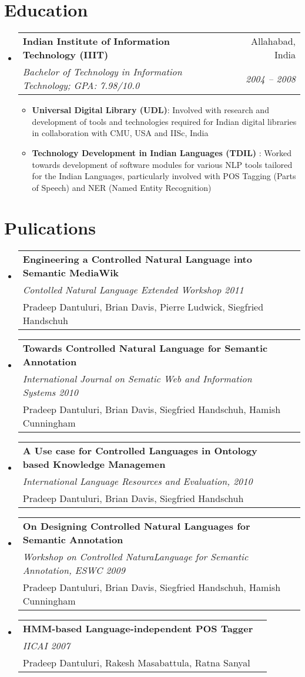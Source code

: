\documentclass[letterpaper,11pt]{article}
\makeatletter
\newcommand{\resumeItem}[2]{
  \item\small{
    \textbf{#1}{: #2 \vspace{-2pt}}
  }
}
\newcommand{\resumeSubheading}[4]{
  \vspace{-1pt}\item
    \begin{tabular*}{0.97\textwidth}[t]{l@{\extracolsep{\fill}}r}
      \textbf{#1} & #2 \\
      \textit{\small#3} & \textit{\small #4} \\
    \end{tabular*}\vspace{-5pt}
}
\newcommand{\pubItem}[3]{
  \vspace{-1pt}\item
    \begin{tabular*}{0.97\textwidth}[t]{l@{\extracolsep{\fill}}r}
      \textbf{#1} &   \\
      \textit{\small#2} &   \\
      \small#3 &  \\
    \end{tabular*}\vspace{-5pt}
}
\newcommand{\resumeSubHeadingListStart}{\begin{itemize}[leftmargin=*]}
\newcommand{\resumeSubHeadingListEnd}{\end{itemize}}
\newcommand{\resumeItemListStart}{\begin{itemize}}
\newcommand{\resumeItemListEnd}{\end{itemize}\vspace{-5pt}}
\makeatother
\begin{document}
\section{Education}
  \resumeSubHeadingListStart
    \resumeSubheading
      {Indian Institute of Information Technology (IIIT) }{Allahabad, India}
      {Bachelor of Technology in Information Technology;  GPA: 7.98/10.0 }{ 2004 -- 2008}     
      \resumeItemListStart
        \resumeItem{Universal Digital Library (UDL)} 
          {Involved with research and development of tools and technologies required for Indian digital libraries in collaboration with CMU, USA and IISc, India}
        \resumeItem{Technology Development in Indian Languages (TDIL) }
          {Worked towards development of software modules for various NLP tools tailored for the Indian Languages, particularly involved with POS Tagging (Parts of Speech) and NER (Named Entity Recognition)}
      \resumeItemListEnd
  \resumeSubHeadingListEnd


\section{Pulications}
  \resumeSubHeadingListStart
    \pubItem
      {Engineering a Controlled Natural Language into Semantic MediaWik}
      {Contolled Natural Language Extended Workshop 2011}
      { Pradeep Dantuluri, Brian Davis, Pierre Ludwick, Siegfried Handschuh}
    \pubItem
      {Towards Controlled Natural Language for Semantic Annotation }
      {International Journal on Sematic Web and Information Systems 2010 }
      { Pradeep Dantuluri, Brian Davis, Siegfried Handschuh, Hamish Cunningham}
    \pubItem
      {A Use case for Controlled Languages in Ontology based Knowledge Managemen }
      { International Language Resources and Evaluation, 2010 }
      { Pradeep Dantuluri, Brian Davis, Siegfried Handschuh}
    \pubItem
      {On Designing Controlled Natural Languages for Semantic Annotation  }
      {Workshop on Controlled NaturaLanguage for Semantic Annotation, ESWC 2009 }
      { Pradeep Dantuluri, Brian Davis, Siegfried Handschuh, Hamish Cunningham}
    \pubItem
      {HMM-based Language-independent POS Tagger }
      {IICAI 2007}
      {Pradeep Dantuluri, Rakesh Masabattula, Ratna Sanyal}
  \resumeSubHeadingListEnd





\end{document}
